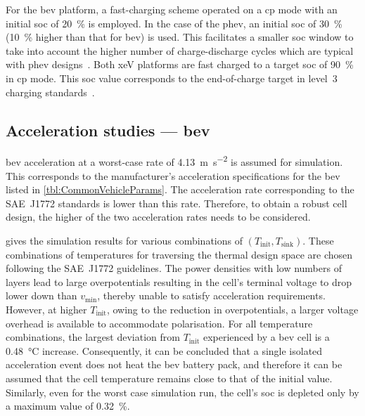 For the \gls{bev}  platform, a fast-charging scheme operated on  a \gls{cp} mode
with an initial  \gls{soc} of \SI{20}{\percent} is employed. In  the case of the
\gls{phev}, an initial \gls{soc}  of \SI{30}{\percent} (\SI{10}{\percent} higher
than that for \gls{bev}) is used. This facilitates a smaller \gls{soc} window to
take into account the higher number of charge-discharge cycles which are typical
with \gls{phev} designs~\cite{Maksimovic2012}. Both \gls{xeV} platforms are fast
charged  to a  target  \gls{soc}  of \SI{90}{\percent}  in  \gls{cp} mode.  This
\gls{soc}  value corresponds  to the  end-of-charge target  in level~3  charging
standards~\cite{SAECharging2011}.

\subsection{Acceleration studies --- \gls{bev}}

\gls{bev}       acceleration      at       a       worst-case      rate       of
\SI{4.13}{\meter\per\second\squared} is assumed for simulation. This corresponds
to the  manufacturer's acceleration specifications  for the \gls{bev}  listed in
\cref{tbl:CommonVehicleParams}.  The  acceleration  rate  corresponding  to  the
SAE~J1772 standards is lower than this  rate. Therefore, to obtain a robust cell
design, the higher of the two acceleration rates needs to be considered.

  gives the  simulation  results  for various  combinations
of  $(T_\text{init}, T_\text{sink})$.  These  combinations  of temperatures  for
traversing  the  thermal  design  space   are  chosen  following  the  SAE~J1772
guidelines.  The power  densities  with  low numbers  of  layers  lead to  large
overpotentials resulting in the cell's terminal  voltage to drop lower down than
$v_\text{min}$, thereby unable to satisfy acceleration requirements. However, at
higher  $T_\text{init}$, owing  to  the reduction  in  overpotentials, a  larger
voltage overhead is  available to accommodate polarisation.  For all temperature
combinations,  the  largest  deviation  from $T_\text{init}$  experienced  by  a
\gls{bev} cell is a \SI{0.48}{\degreeCelsius}  increase. Consequently, it can be
concluded that a single isolated acceleration  event does not heat the \gls{bev}
battery pack, and therefore it can  be assumed that the cell temperature remains
close  to  that  of the  initial  value.  Similarly,  even  for the  worst  case
simulation run,  the cell's  \gls{soc} is  depleted only by  a maximum  value of
\SI{0.32}{\percent}.

